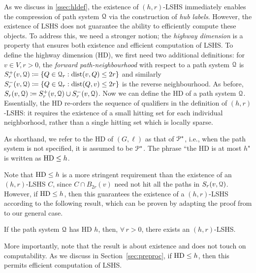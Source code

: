 As we discuss in \cref{ssec:hldef}, the existence of $(h,r)$-LSHS immediately enables the compression of path system $\calQ$ via the construction of \emph{hub labels}. 
However, the existence of LSHS does not guarantee the ability to efficiently compute these objects. 
To address this, we need a stronger notion; the \emph{highway dimension} is a property that ensures both existence and efficient computation of LSHS.
To define the highway dimension (HD), we first need two additional definitions:
for $v\in V, r>0$, the \emph{forward path-neighbourhood} with respect to a path system $\calQ$ is $
S_r^+(v,\calQ) \defeq\crl*{Q\in\calQ_r: \dist(v,Q)\leq 2r}$ and similarly $S_r^-(v,\calQ) \defeq\crl*{Q\in\calQ_r: \dist(Q,v)\leq 2r}$ is the reverse neighbourhood.
As before, $S_r(v,\calQ) \defeq S_r^+(v,\calQ)\cup S_r^-(v,\calQ)$. 
Now we can define the HD of a path system $\calQ$. 
Essentially, the HD re-orders the sequence of qualifiers in the definition of $(h,r)$-LSHS: it requires the existence of a small hitting set for each individual neighborhood, rather than a single hitting set which is locally sparse. 

As shorthand, we refer to the HD of $(G,\ell)$ as that of $\PS$, i.e., when the path system is not specified, it is assumed to be $\PS$.
The phrase ``the HD is at most $h$" is written as $\hd\leq h$. 

Note that $\hd\leq h$ is a more stringent requirement than the existence of an $(h,r)$-LSHS $C$, since $C\cap B_{2r}(v)$ need not hit all the paths in $S_r(v,\calQ)$. 
However, if $\hd \leq h$, then this guarantees the existence of a $(h,r)$-LSHS according to the following result, which can be proven by adapting the proof from \cite[Theorem 4.2]{highway2013} to our general case.
\begin{proposition}\label{prop:equiv}
If the path system $\calQ$ has HD $h$, then, $\forall\,r>0$, there exists an $(h,r)$-LSHS.
\end{proposition}

More importantly, note that the result is about existence and does not touch on computability.
As we discuss in Section~\ref{sec:preproc}, if $\hd \leq h$, then this permits efficient computation of LSHS.